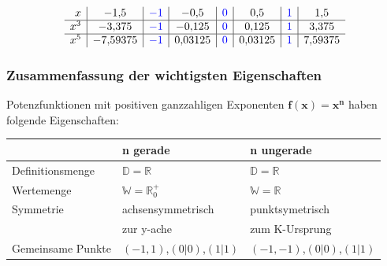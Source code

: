 \begin{multicols}{2}
    \[\begin{array}{r|c|c|c|c|c|c|c} x & -1{,}5 & {\color{blue}-1} & -0{,}5 & {\color{blue}0} & 0{,}5 & {\color{blue}1} & 1{,}5 \\ \hline x^3 & -3{,}375 & {\color{blue}-1} & -0{,}125 & {\color{blue}0} & 0{,}125 & {\color{blue}1} & 3{,}375 \\ \hline x^5 & -7{,}59375 & {\color{blue}-1} & 0{,}03125 & {\color{blue}0} & 0{,}03125 & {\color{blue}1} & 7{,}59375 \end{array}\]

    \subsubsection{Zusammenfassung der wichtigsten Eigenschaften}
    \vspace{-4mm}
    Potenzfunktionen mit positiven ganzzahligen Exponenten $\boldsymbol{f(x) = x^n}$ haben folgende Eigenschaften:
    \begin{tabularx}{0.5\textwidth} {
            | >{\raggedright\arraybackslash}X
            | >{\raggedright\arraybackslash}X
            | >{\raggedright\arraybackslash}X |}
        \hline
                          & \textbf{n gerade}                 & \textbf{n ungerade}       \\ \hline
        Definitionsmenge  & $\mathbb{D} = \mathbb{R}$         & $\mathbb{D} = \mathbb{R}$ \\ \hline
        Wertemenge        & $\mathbb{W} = \mathbb{R}^{+}_{0}$ & $\mathbb{W} = \mathbb{R}$ \\ \hline
        Symmetrie         & achsensymmetrisch                 & punktsymetrisch           \\
                          & zur y-ache                        & zum K-Ursprung            \\ \hline
        Gemeinsame Punkte & $(-1,1)$,$(0|0)$,$(1|1)$          & $(-1,-1)$,$(0|0)$,$(1|1)$ \\ \hline
    \end{tabularx}

\end{multicols}
